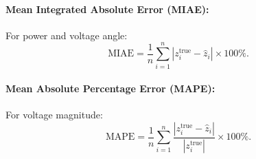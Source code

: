\documentclass[11pt,a4paper]{article}
\begin{document}
\paragraph{Mean Integrated Absolute Error (MIAE):}
For power and voltage angle:
\begin{equation}
  \mathrm{MIAE} = \frac{1}{n}\sum_{i=1}^{n} |z_i^{\text{true}} - \hat{z}_i| \times 100\%.
\end{equation}

\paragraph{Mean Absolute Percentage Error (MAPE):}
For voltage magnitude:
\begin{equation}
  \mathrm{MAPE} = \frac{1}{n}\sum_{i=1}^{n} \frac{|z_i^{\text{true}} - \hat{z}_i|}{|z_i^{\text{true}}|} \times 100\%.
\end{equation}
\end{document}
